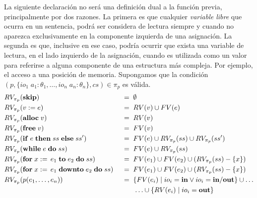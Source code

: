 \iffalse
Comenzaremos con la formalización de la función para el caso de las sentencias, ya que resulta ser el más intuitivo.
Recordar que las sentencias que pueden modificar el estado de una variable comprenden la asignación, los procedimientos \textit{alloc} y \textit{free}, y los procedimientos declarados por el usuario.
Resulta claro que incluso en estas situaciones, ciertas ocurrencias de variables podrán ser de \textit{lectura}.
El razonamiento detrás de la definición para la función de expresiones, estará condicionado por esta particularidad.
En cambio para el resto de las sentencias, las ocurrencias de variables solo serán de \textit{lectura}; donde la función para \textit{variables libres} de expresiones es fundamental en este contexto.
Nuevamente notar el abuso de notación cuando se aplica la función a un bloque de sentencias $ss$, en esta situación se procede de manera análoga al caso anterior.
\fi

La siguiente declaración no será una definición dual a la función previa, principalmente por dos razones.
La primera es que cualquier \textit{variable libre} que ocurra en un sentencia, podrá ser considera de lectura siempre y cuando no aparezca exclusivamente en la componente izquierda de una asignación.
La segunda es que, inclusive en ese caso, podría ocurrir que exista una variable de lectura, en el lado izquierdo de la asignación, cuando es utilizada como un valor para referirse a alguna componente de una estructura más compleja.
Por ejemplo, el acceso a una posición de memoria.
Supongamos que la condición $(p, \{ io_1 \; a_1: \theta_1, \ldots, io_n \; a_n: \theta_n \}, cs) \in \pi_{p}$ es válida.
\begin{alignat*}{2}
&RV_{\pi_{p}}(\mathbf{skip})
&&\;=\;
\emptyset
\\
&RV_{\pi_{p}}(v := e)
&&\;=\;
RV(v) \cup FV(e)
\\
&RV_{\pi_{p}}(\mathbf{alloc} \; v)
&&\;=\;
RV(v)
\\
&RV_{\pi_{p}}(\mathbf{free} \; v)
&&\;=\;
FV(v)
\\
&RV_{\pi_{p}}(\mathbf{if} \; e \; \mathbf{then} \; ss \; \mathbf{else} \; ss')
&&\;=\;
FV(e) \cup RV_{\pi_{p}}(ss) \cup RV_{\pi_{p}}(ss')
\\
&RV_{\pi_{p}}(\mathbf{while} \; e \; \mathbf{do} \; ss)
&&\;=\;
FV(e) \cup RV_{\pi_{p}}(ss)
\\
&RV_{\pi_{p}}(\mathbf{for} \; x := \, e_1 \; \mathbf{to} \; e_2 \; \mathbf{do} \; ss)
&&\;=\;
FV(e_1) \cup FV(e_2) \cup (RV_{\pi_{p}}(ss) - \{ x \})
\\
&RV_{\pi_{p}}(\mathbf{for} \; x := \, e_1 \; \mathbf{downto} \; e_2 \; \mathbf{do} \; ss)
&&\;=\;
FV(e_1) \cup FV(e_2) \cup (RV_{\pi_{p}}(ss) - \{ x \})
\\
&RV_{\pi_{p}}(p(e_1, \ldots, e_n))
&&\;=\;
\{ FV(e_i) \mid io_i = \mathbf{in} \vee io_i = \mathbf{in/out} \}
\cup \ldots
\\&&&\qquad
\ldots \cup
\{ RV(e_i) \mid io_i = \mathbf{out} \}
\end{alignat*}

